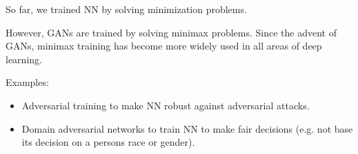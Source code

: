 \begin{concept}
    So far, we trained NN by solving minimization problems.

    However, GANs are trained by solving minimax problems. Since the advent of GANs, minimax training has become more widely used in all areas of deep learning.

    Examples:

    \begin{itemize}
        \item Adversarial training to make NN robust against adversarial attacks.
        \item Domain adversarial networks to train NN to make fair decisions (e.g. not base its decision on a persons race or gender).
    \end{itemize}
\end{concept}

